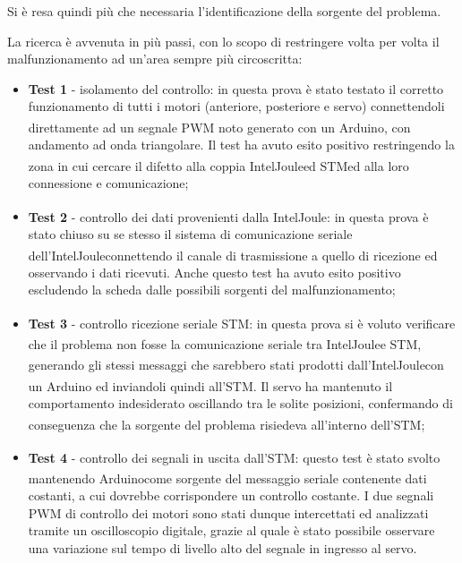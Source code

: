 Si è resa quindi più che necessaria l’identificazione della sorgente del problema. 
\bigskip

La ricerca è avvenuta in più passi, con lo scopo di restringere volta per volta il malfunzionamento ad un’area sempre più circoscritta:

\begin{itemize}
    \bigskip
    \item \textbf{Test 1} - isolamento del controllo: in questa prova è stato testato il corretto funzionamento di tutti i motori (anteriore, posteriore e servo) connettendoli direttamente ad un segnale PWM noto generato con un Arduino\textsuperscript\textregistered, con andamento ad onda triangolare. Il test ha avuto esito positivo restringendo la zona in cui cercare il difetto alla coppia Intel\textsuperscript\textregistered Joule\texttrademark\hspace{1mm}ed STM\textsuperscript\textregistered\hspace{1mm}ed alla loro connessione e comunicazione;
    \bigskip
    \item \textbf{Test 2} - controllo dei dati provenienti dalla Intel\textsuperscript\textregistered Joule\texttrademark\hspace{1mm}: in questa prova è stato chiuso su se stesso il sistema di comunicazione seriale dell’Intel\textsuperscript\textregistered Joule\texttrademark\hspace{1mm}connettendo il canale di trasmissione a quello di ricezione ed osservando i dati ricevuti. Anche questo test ha avuto esito positivo escludendo la scheda dalle possibili sorgenti del malfunzionamento;
    \bigskip
    \item \textbf{Test 3} - controllo ricezione seriale STM\textsuperscript\textregistered: in questa prova si è voluto verificare che il problema non fosse la comunicazione seriale tra Intel\textsuperscript\textregistered Joule\texttrademark\hspace{1mm}e STM\textsuperscript\textregistered, generando gli stessi messaggi che sarebbero stati prodotti dall'Intel\textsuperscript\textregistered Joule\texttrademark\hspace{1mm}con un Arduino ed inviandoli quindi all’STM\textsuperscript\textregistered. Il servo ha mantenuto il comportamento indesiderato oscillando tra le solite posizioni, confermando di conseguenza che la sorgente del problema risiedeva all’interno dell’STM\textsuperscript\textregistered;
    \bigskip
    \item \textbf{Test 4} - controllo dei segnali in uscita dall’STM\textsuperscript\textregistered: questo test è stato svolto mantenendo Arduino\textsuperscript\textregistered\hspace{1mm}come sorgente del messaggio seriale contenente dati costanti, a cui dovrebbe corrispondere un controllo costante. I due segnali PWM di controllo dei motori sono stati dunque intercettati ed analizzati tramite un oscilloscopio digitale, grazie al quale è stato possibile osservare una variazione sul tempo di livello alto del segnale in ingresso al servo.

\end{itemize}
